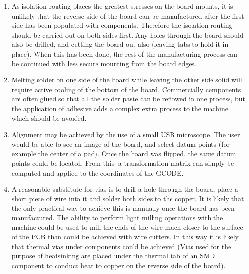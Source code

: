\begin{enumerate}
	\item	As isolation routing places the greatest stresses on the board mounts, it is unlikely that the reverse side of the board can be manufactured
			after the first side has been populated with components. Therefore the isolation routing should be carried out on both sides first. Any holes
			through the board should also be drilled, and cutting the board out also (leaving tabs to hold it in place). When this has been done, the
			rest of the manufacturing process can be continued with less secure mounting from the board edges.
	\item	Melting solder on one side of the board while leaving the other side solid will require active cooling of the bottom of the board. Commercially
			components are often glued so that all the solder paste can be reflowed in one process, but the application of adhesive adds a complex extra
			process to the machine which should be avoided.
	\item	Alignment may be achieved by the use of a small USB microscope. The user would be able to see an image of the board, and select datum points (for
			example the center of a pad). Once the board was flipped, the same datum points could be located. From this, a transformation matrix can simply
			be computed and applied to the coordinates of the GCODE.
	\item	A reasonable substitute for vias is to drill a hole through the board, place a short piece of wire into it and solder both sides to the copper.
			It is likely that the only practical way to achieve this is manually once the board has been manufactured. The ability to perform light milling
			operations with the machine could be used to mill the ends of the wire much closer to the surface of the PCB than could be achieved with wire cutters.
			In this way it is likely that thermal vias under components could be achieved (Vias used for the purpose of heatsinking are placed under the thermal
			tab of an SMD component to conduct heat to copper on the reverse side of the board).
\end{enumerate}

